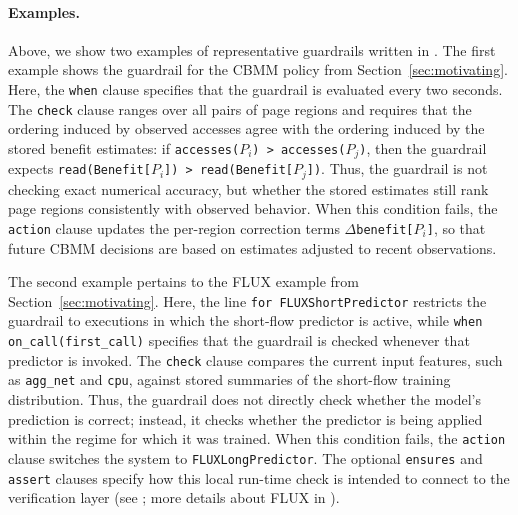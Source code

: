 \paragraph{Examples.}
Above, we show two examples of %
representative guardrails written in \lang. The first example shows the guardrail for the CBMM policy from Section~\ref{sec:motivating}. Here, the {\tt when} clause specifies that the guardrail is evaluated every two seconds. The {\tt check} clause ranges over all pairs of page regions and requires that the ordering induced by observed accesses agree with the ordering induced by the stored benefit estimates: if {\tt accesses($P_i$) > accesses($P_j$)}, then the guardrail expects {\tt read(Benefit[$P_i$]) > read(Benefit[$P_j$])}. Thus, the guardrail is not checking exact numerical accuracy, but whether the stored estimates still rank page regions consistently with observed behavior. When this condition fails, the {\tt action} clause updates the per-region correction terms {\tt $\Delta$benefit[$P_i$]}, so that future CBMM decisions are based on estimates adjusted to recent observations.

The second example pertains to the  FLUX example from Section~\ref{sec:motivating}. Here, the line {\tt for FLUXShortPredictor} restricts the guardrail to executions in which the short-flow predictor is active, while {\tt when on\_call(first\_call)} specifies that the guardrail is checked whenever that predictor is invoked. The {\tt check} clause compares the current input features, such as {\tt agg\_net} and {\tt cpu}, against stored summaries of the short-flow training distribution. Thus, the guardrail does not directly check whether the model's prediction is correct; instead, it checks whether the predictor is being applied within the regime for which it was trained. When this condition fails, the {\tt action} clause switches the system to {\tt FLUXLongPredictor}. The optional {\tt ensures} and {\tt assert} clauses specify how this local run-time check is intended to connect to the verification layer (see ; more details about FLUX in ). 